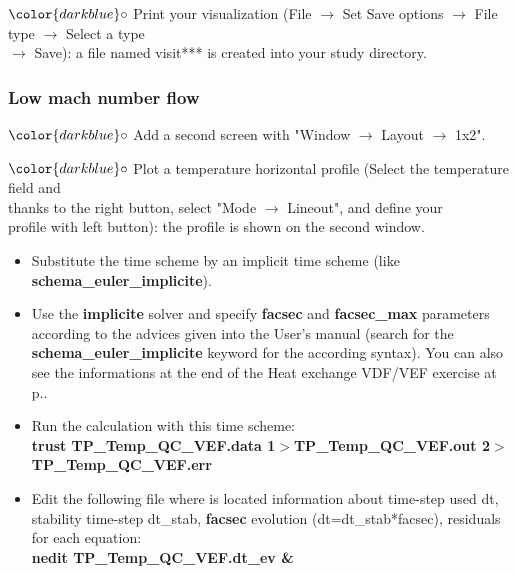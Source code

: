 \documentclass[10pt]{beamer}
\begin{document}
\begin{frame}
\begin{block}{}
\hspace{1cm} $\color{darkblue}\circ$ {\small{Print your visualization (File $\rightarrow$ Set Save options $\rightarrow$ File type $\rightarrow$ Select a type \\
\hspace{1.3cm}  $\rightarrow$ Save): a file named visit*** is created into your study directory.}}

\end{block}
\end{frame}
\begin{frame}
\frametitle{Low mach number flow}
\begin{block}{}

\hspace{1cm} $\color{darkblue}\circ$ {\small{Add a second screen with "Window $\rightarrow$ Layout $\rightarrow$ 1x2".}}

\hspace{1cm} $\color{darkblue}\circ$ {\small{Plot a temperature horizontal profile (Select the temperature field and \\
\hspace{1.3cm} thanks to the right button, select "Mode $\rightarrow$ Lineout", and define your \\
\hspace{1.3cm} profile with left button): the profile is shown on the second window.}}

\begin{itemize}
\item Substitute the time scheme by an implicit time scheme (like \textbf{schema\_euler\_implicite}). 

\item Use the \textbf{implicite} solver and specify \textbf{facsec} and \textbf{facsec\_max} parameters according to the advices given into the User's manual (search for the \textbf{schema\_euler\_implicite} keyword for the according syntax). You can also see the informations at the end of the Heat exchange VDF/VEF exercise at p.\pageref{schema_impl}.

\item Run the calculation with this time scheme: \\
{\footnotesize{\textbf{trust TP\_Temp\_QC\_VEF.data 1$>$TP\_Temp\_QC\_VEF.out 2$>$TP\_Temp\_QC\_VEF.err}}}

\item Edit the following file where is located information about time-step used dt, stability time-step dt\_stab, \textbf{facsec} evolution (dt=dt\_stab*facsec), residuals for each equation: \\
\textbf{nedit TP\_Temp\_QC\_VEF.dt\_ev \&}
\end{itemize}

\end{block}
\end{frame}
\end{document}

